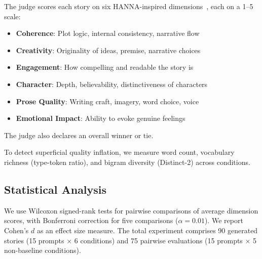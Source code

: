 The judge scores each story on six HANNA-inspired dimensions~\citep{chhun2022hanna}, each on a 1--5 scale:
\begin{itemize}[leftmargin=*,itemsep=0pt,topsep=0pt]
    \item \textbf{Coherence}: Plot logic, internal consistency, narrative flow
    \item \textbf{Creativity}: Originality of ideas, premise, narrative choices
    \item \textbf{Engagement}: How compelling and readable the story is
    \item \textbf{Character}: Depth, believability, distinctiveness of characters
    \item \textbf{Prose Quality}: Writing craft, imagery, word choice, voice
    \item \textbf{Emotional Impact}: Ability to evoke genuine feelings
\end{itemize}
The judge also declares an overall winner or tie.

To detect superficial quality inflation, we measure word count, vocabulary richness (type-token ratio), and bigram diversity (Distinct-2) across conditions.

\subsection{Statistical Analysis}
\label{sec:stats}

We use Wilcoxon signed-rank tests for pairwise comparisons of average dimension scores, with Bonferroni correction for five comparisons ($\alpha = 0.01$).
We report Cohen's $d$ as an effect size measure.
The total experiment comprises 90 generated stories (15 prompts $\times$ 6 conditions) and 75 pairwise evaluations (15 prompts $\times$ 5 non-baseline conditions).
